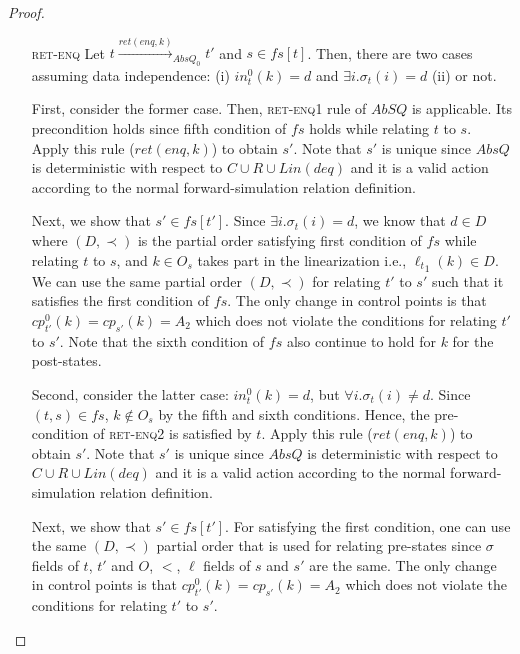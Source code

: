 \begin{proof}
\begin{itemize}
\item[\textsc{ret-enq}] Let $t \xrightarrow{ret(enq,k)}_{AbsQ_0} t'$ and $s \in fs[t]$. Then, there are two cases assuming data independence: (i) $in^0_t(k)=d$ and $\exists i. \sigma_t(i)= d$ (ii) or not.   

First, consider the former case. Then, \textsc{ret-enq1} rule of $AbSQ$ is applicable. Its precondition holds since fifth condition of $fs$ holds while relating $t$ to $s$. Apply this rule ($ret(enq,k)$) to obtain $s'$. Note that $s'$ is unique since $AbsQ$ is deterministic with respect to $C \cup R \cup Lin(deq)$ and it is a valid action according to the normal forward-simulation relation definition.

Next, we show that $s' \in fs[t']$. Since $\exists i. \sigma_t(i) = d$, we know that $d \in D$ where $(D, \prec)$ is the partial order satisfying first condition of $fs$ while relating $t$ to $s$, and $k \in O_s$ takes part in the linearization i.e., ${\ell_t}_1(k) \in D$. We can use the same partial order $(D,\prec)$ for relating $t'$ to $s'$ such that it satisfies the first condition of $fs$. The only change in control points is that $cp^0_{t'}(k) = cp_{s'}(k) = A_2$ which does not violate the conditions for relating $t'$ to $s'$. Note that the sixth condition of $fs$ also continue to hold for $k$ for the post-states.

Second, consider the latter case:  $in^0_t(k)=d$, but $\forall i. \sigma_t(i)\neq d$. Since $(t,s) \in fs$, $k \notin O_s$ by the fifth and sixth conditions. Hence, the pre-condition of \textsc{ret-enq2} is satisfied by $t$. Apply this rule ($ret(enq,k)$) to obtain $s'$. Note that $s'$ is unique since $AbsQ$ is deterministic with respect to $C \cup R \cup Lin(deq)$ and it is a valid action according to the normal forward-simulation relation definition.

Next, we show that $s' \in fs[t']$. For satisfying the first condition, one can use the same $(D, \prec)$ partial order that is used for relating pre-states since $\sigma$ fields of $t$, $t'$ and $O$, $<$, $\ell$ fields of $s$ and $s'$ are the same.  The only change in control points is that $cp^0_{t'}(k) = cp_{s'}(k) = A_2$ which does not violate the conditions for relating $t'$ to $s'$.


\end{itemize}
\end{proof}
